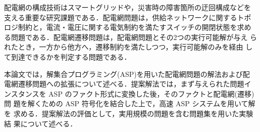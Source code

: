 配電網の構成技術はスマートグリッドや，災害時の障害箇所の迂回構成などを
支える重要な研究課題である．配電網問題は，供給ネットワークに関するトポ
ロジ制約と，電流・電圧に関する電気制約を満たすスイッチの開閉状態を求め
る問題である．配電網遷移問題は，配電網問題とその2つの実行可能解が与え
られたとき，一方から他方へ，遷移制約を満たしつつ，実行可能解のみを経由
して到達できるかを判定する問題である．

本論文では，解集合プログラミング(ASP)を用いた配電網問題の解法および配
電網遷移問題への拡張について述べる．提案解法では，まず与えられた問題イ
ンスタンスを ASP のファクト形式に変換した後，そのファクトと配電網(遷移)問
題を解くための ASP 符号化を結合した上で，高速 ASP システムを用いて解を
求める．提案解法の評価として，実用規模の問題を含む問題集を用いた実験結
果について述べる．
